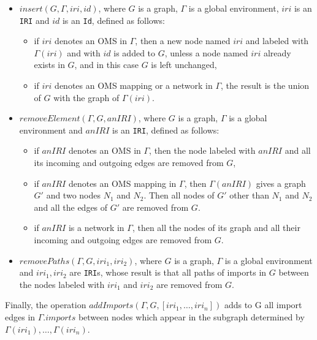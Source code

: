 \documentclass[10pt,fleqn,final]{scrreprt}
\newcommand*{\syntax}[1]{\texttt{#1}}
\begin{document}
\begin{itemize}
\item $insert(G, \Gamma, iri,id)$, where $G$ is a graph, 
      $\Gamma$ is a global environment, $iri$ is an \syntax{IRI} and 
      $id$ is an \syntax{Id}, defined as follows:
 \begin{itemize}
    \item if $iri$ denotes an OMS in $\Gamma$, then
                 a new node named $iri$ and labeled with $\Gamma(iri)$ and with $id$ is added to $G$,
                 unless a node named $iri$ already exists in $G$, and in this case $G$ is left unchanged,
   \item if $iri$ denotes an OMS mapping 
      or a network in $\Gamma$, 
      the result is the union of $G$ with the graph of $\Gamma(iri)$.
 \end{itemize}

\item $removeElement(\Gamma, G, anIRI)$, where $G$ is a graph, 
      $\Gamma$ is a global environment and $anIRI$ is an \syntax{IRI},
      defined as follows: 

 \begin{itemize}
    \item if $anIRI$ denotes an OMS in $\Gamma$, 
          then the node labeled with $anIRI$ and all its incoming and outgoing
                edges are removed from $G$,
   \item  if $anIRI$ denotes an OMS mapping in $\Gamma$, then  
   $\Gamma(anIRI)$ gives a graph $G'$ and two nodes 
   $N_1$ and $N_2$. Then all nodes of $G'$ other than $N_1$ and
   $N_2$ and all the edges of $G'$ are removed from $G$.
   \item if $anIRI$ is a network in $\Gamma$, then all the nodes of its graph and all their incoming and outgoing edges are removed 
               from $G$.
 \end{itemize}

 \item $removePaths(\Gamma, G, iri_1, iri_2)$, where $G$ is a graph, 
      $\Gamma$ is a global environment and $iri_1, iri_2$ are \syntax{IRI}s,
 whose result is that
 all paths of imports in $G$ between the nodes labeled with 
 $iri_1$ and $iri_2$ are removed from $G$.

\end{itemize}

Finally, the operation $addImports(\Gamma, G, [iri_1, \ldots, iri_n])$ adds to G
all import edges in $\Gamma.imports$ between nodes which appear 
in the subgraph determined by  $\Gamma(iri_1), \ldots, \Gamma(iri_n)$. 
\end{document}
